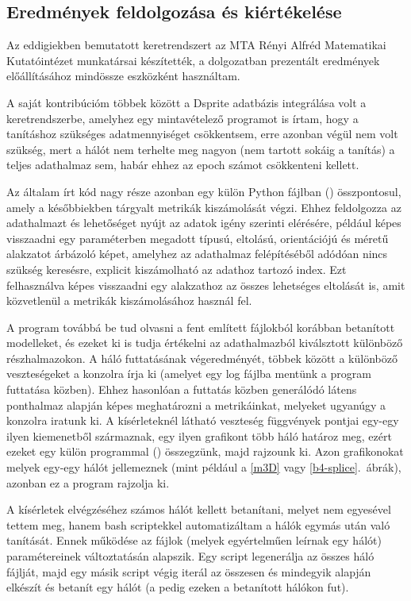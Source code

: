 \subsection{Eredmények feldolgozása és kiértékelése}

Az eddigiekben bemutatott keretrendszert az MTA Rényi Alfréd Matematikai Kutatóintézet munkatársai készítették, a dolgozatban prezentált eredmények előállításához mindössze eszközként használtam.

A saját kontribúcióm többek között a Dsprite adatbázis integrálása volt a keretrendszerbe, amelyhez egy mintavételező programot is írtam, hogy a tanításhoz szükséges adatmennyiséget csökkentsem, erre azonban végül nem volt szükség, mert a hálót nem terhelte meg nagyon (nem tartott sokáig a tanítás) a teljes adathalmaz sem, habár ehhez az epoch számot csökkenteni kellett. 

Az általam írt kód nagy része azonban egy külön Python fájlban () összpontosul, amely a későbbiekben tárgyalt metrikák kiszámolását végzi. Ehhez feldolgozza az adathalmazt és lehetőséget nyújt az adatok igény szerinti elérésére, például képes visszaadni egy paraméterben megadott típusú, eltolású, orientációjú és méretű alakzatot árbázoló képet, amelyhez az adathalmaz felépítéséből adódóan nincs szükség keresésre, explicit kiszámolható az adathoz tartozó index. Ezt felhasználva képes visszaadni egy alakzathoz az összes lehetséges eltolását is, amit közvetlenül a metrikák kiszámolásához használ fel.

A program továbbá be tud olvasni a fent említett fájlokból korábban betanított modelleket, és ezeket ki is tudja értékelni az adathalmazból kiválsztott különböző részhalmazokon. A háló futtatásának végeredményét, többek között a különböző veszteségeket  a konzolra írja ki (amelyet egy log fájlba mentünk a program futtatása közben). Ehhez hasonlóan a futtatás közben generálódó látens ponthalmaz alapján képes meghatározni a metrikáinkat, melyeket ugyanúgy a konzolra iratunk ki. A kísérleteknél látható veszteség függvények pontjai egy-egy ilyen kiemenetből származnak, egy ilyen grafikont több háló határoz meg, ezért ezeket egy külön programmal () összegzünk, majd rajzounk ki. Azon grafikonokat melyek egy-egy hálót jellemeznek (mint például a \ref{m3D} vagy \ref{b4-splice}.~ábrák), azonban ez a program rajzolja ki.

A kísérletek elvégzéséhez számos hálót kellett betanítani, melyet nem egyesével tettem meg, hanem bash scriptekkel automatizáltam a hálók egymás után való tanítását. Ennek működése az  fájlok (melyek egyértelműen leírnak egy hálót) paramétereinek változtatásán alapszik. Egy script legenerálja az összes háló  fájlját, majd egy másik script végig iterál az összesen és mindegyik alapján elkészít és betanít egy hálót (a  pedig ezeken a betanított hálókon fut). 


